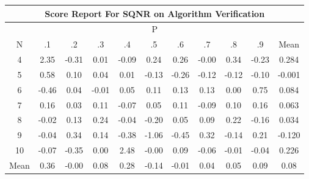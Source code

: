 \documentclass[11pt,a4paper]{report}
\begin{document}
\begin{longtable}{ | c || c | c | c | c | c | c | c | c | c || c |}
\hline
\multicolumn{11}{|c|}{ Score Report For SQNR on Algorithm Verification} \\
\hline
\multicolumn{11}{|c|}{ P } \\
\hline
N & .1 & .2 & .3 & .4 & .5 & .6 & .7 & .8 & .9 & Mean\\
 \hline
 \hline
 \endhead
  4 &  \cellcolor[HTML]{C7C7FF} 2.35 &  \cellcolor[HTML]{FFF7F7} -0.31 &  \cellcolor[HTML]{FFFFFF} 0.01 &  \cellcolor[HTML]{FFFFFF} -0.09 &  \cellcolor[HTML]{F7F7FF} 0.24 &  \cellcolor[HTML]{F7F7FF} 0.26 &  \cellcolor[HTML]{FFFFFF} -0.00 &  \cellcolor[HTML]{F7F7FF} 0.34 &  \cellcolor[HTML]{FFF7F7} -0.23 & 0.284 \\
  5 &  \cellcolor[HTML]{EFEFFF} 0.58 &  \cellcolor[HTML]{FFFFFF} 0.10 &  \cellcolor[HTML]{FFFFFF} 0.04 &  \cellcolor[HTML]{FFFFFF} 0.01 &  \cellcolor[HTML]{FFFFFF} -0.13 &  \cellcolor[HTML]{FFF7F7} -0.26 &  \cellcolor[HTML]{FFFFFF} -0.12 &  \cellcolor[HTML]{FFFFFF} -0.12 &  \cellcolor[HTML]{FFFFFF} -0.10 & -0.001 \\
  6 &  \cellcolor[HTML]{FFF7F7} -0.46 &  \cellcolor[HTML]{FFFFFF} 0.04 &  \cellcolor[HTML]{FFFFFF} -0.01 &  \cellcolor[HTML]{FFFFFF} 0.05 &  \cellcolor[HTML]{FFFFFF} 0.11 &  \cellcolor[HTML]{FFFFFF} 0.13 &  \cellcolor[HTML]{FFFFFF} 0.13 &  \cellcolor[HTML]{FFFFFF} 0.00 &  \cellcolor[HTML]{EFEFFF} 0.75 & 0.084 \\
  7 &  \cellcolor[HTML]{F7F7FF} 0.16 &  \cellcolor[HTML]{FFFFFF} 0.03 &  \cellcolor[HTML]{FFFFFF} 0.11 &  \cellcolor[HTML]{FFFFFF} -0.07 &  \cellcolor[HTML]{FFFFFF} 0.05 &  \cellcolor[HTML]{FFFFFF} 0.11 &  \cellcolor[HTML]{FFFFFF} -0.09 &  \cellcolor[HTML]{FFFFFF} 0.10 &  \cellcolor[HTML]{F7F7FF} 0.16 & 0.063 \\
  8 &  \cellcolor[HTML]{FFFFFF} -0.02 &  \cellcolor[HTML]{FFFFFF} 0.13 &  \cellcolor[HTML]{F7F7FF} 0.24 &  \cellcolor[HTML]{FFFFFF} -0.04 &  \cellcolor[HTML]{FFF7F7} -0.20 &  \cellcolor[HTML]{FFFFFF} 0.05 &  \cellcolor[HTML]{FFFFFF} 0.09 &  \cellcolor[HTML]{F7F7FF} 0.22 &  \cellcolor[HTML]{FFF7F7} -0.16 & 0.034 \\
  9 &  \cellcolor[HTML]{FFFFFF} -0.04 &  \cellcolor[HTML]{F7F7FF} 0.34 &  \cellcolor[HTML]{FFFFFF} 0.14 &  \cellcolor[HTML]{FFF7F7} -0.38 &  \cellcolor[HTML]{FFE7E7} -1.06 &  \cellcolor[HTML]{FFF7F7} -0.45 &  \cellcolor[HTML]{F7F7FF} 0.32 &  \cellcolor[HTML]{FFFFFF} -0.14 &  \cellcolor[HTML]{F7F7FF} 0.21 & -0.120 \\
  10 &  \cellcolor[HTML]{FFFFFF} -0.07 &  \cellcolor[HTML]{FFF7F7} -0.35 &  \cellcolor[HTML]{FFFFFF} 0.00 &  \cellcolor[HTML]{BFBFFF} 2.48 &  \cellcolor[HTML]{FFFFFF} -0.00 &  \cellcolor[HTML]{FFFFFF} 0.09 &  \cellcolor[HTML]{FFFFFF} -0.06 &  \cellcolor[HTML]{FFFFFF} -0.01 &  \cellcolor[HTML]{FFFFFF} -0.04 & 0.226 \\
 \hline
 \hline
Mean &  \cellcolor[HTML]{F7F7FF} 0.36 &  \cellcolor[HTML]{FFFFFF} -0.00 &  \cellcolor[HTML]{FFFFFF} 0.08 &  \cellcolor[HTML]{F7F7FF} 0.28 &  \cellcolor[HTML]{FFFFFF} -0.14 &  \cellcolor[HTML]{FFFFFF} -0.01 &  \cellcolor[HTML]{FFFFFF} 0.04 &  \cellcolor[HTML]{FFFFFF} 0.05 &  \cellcolor[HTML]{FFFFFF} 0.09 &  \cellcolor[HTML]{FFFFFF} 0.08
\end{longtable}
\end{document}
